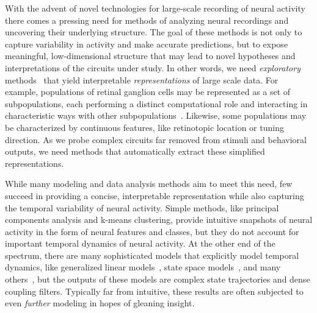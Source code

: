 With the advent of novel technologies for large-scale recording of
neural activity~\cite{grewe2010high, prevedel2014simultaneous,
  churchland2012neural, holekamp2008fast, ahrens2013whole,
  portugues2014whole, alivisatos2012brain, briggman2005optical,
  ahrens2012brain} there comes a pressing need for methods of
analyzing neural recordings and uncovering their underlying structure.
The goal of these methods is not only to capture variability in
activity and make accurate predictions, but to expose meaningful,
low-dimensional structure that may lead to novel hypotheses and
interpretations of the circuits under study. In other words, we
need \emph{exploratory} methods~\cite{tukey1962future} that yield interpretable
\emph{representations} of large scale data.  
For example, populations of retinal ganglion cells may be represented as a 
set of subpopulations, each performing a distinct
computational role and interacting in characteristic ways with
other subpopulations~\cite{sanes2015types}.
Likewise, some populations may be characterized by continuous features,
like retinotopic location or tuning direction.
As we probe complex circuits far removed from stimuli and behavioral
outputs, we need methods that automatically extract these simplified
representations.

While many modeling and data analysis methods aim to meet this
need, few succeed in providing a concise, interpretable representation
while also capturing the temporal variability of neural activity.
Simple methods, like principal components analysis
and k-means clustering, provide intuitive snapshots of neural activity
in the form of neural features and classes,
but they do 
not account for important temporal dynamics of neural activity. 
At the other end of the
spectrum, there are many sophisticated models that explicitly model
temporal dynamics, like generalized linear models~\cite{Truccolo-2005,
  Paninski-2004, Pillow-2008}, state space models~\cite{Smith-2003,
  paninski2010new, Buesing12, escola2011hidden,
  linderman2016nonparametric}, and many others~\cite{Yu09,
  churchland2012neural, cunningham2007inferring},
but the outputs of these models are complex state trajectories and dense
coupling filters. Typically far from intuitive, these results are
often subjected to even \emph{further} modeling in hopes of gleaning insight.

